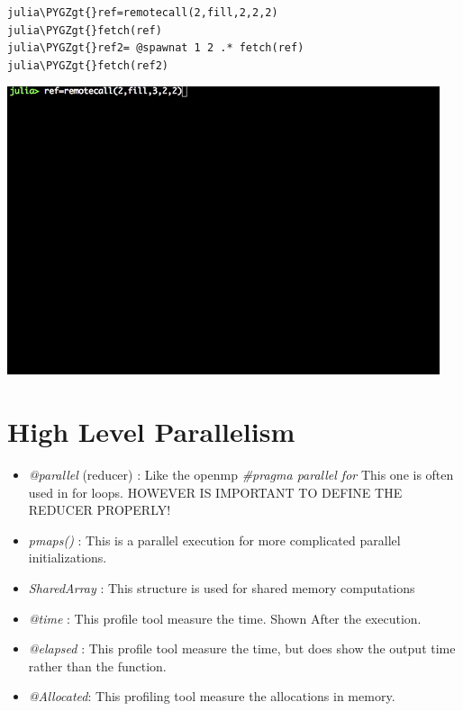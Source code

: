 \documentclass[letterpaper,10pt,english]{sphinxmanual}
\def\PYGZgt{\char`\>}
\begin{document}
\begin{Verbatim}[commandchars=\\\{\}]
julia\PYGZgt{}ref=remotecall(2,fill,2,2,2)
julia\PYGZgt{}fetch(ref)
julia\PYGZgt{}ref2= @spawnat 1 2 .* fetch(ref)
julia\PYGZgt{}fetch(ref2)
\end{Verbatim}

\includegraphics{remotecall.gif}


\section{High Level Parallelism}
\label{JuliaPar:high-level-parallelism}\begin{itemize}
\item {} 
\emph{@parallel} (reducer) : Like the openmp \emph{\#pragma parallel for}
This one is often used in for loops.  HOWEVER IS IMPORTANT TO DEFINE THE REDUCER PROPERLY!

\item {} 
\emph{pmaps()} : This is a parallel execution for more complicated parallel initializations.

\item {} 
\emph{SharedArray} : This structure is used for shared memory computations

\item {} 
\emph{@time} : This profile tool measure the time. Shown After the execution.

\item {} 
\emph{@elapsed} : This profile tool measure the time, but does show the output  time rather than the function.

\item {} 
\emph{@Allocated}: This profiling tool measure the allocations in memory.

\end{itemize}
\end{document}
